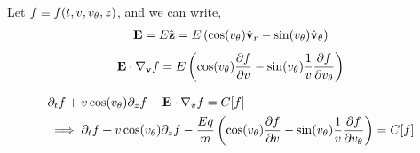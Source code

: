 \documentclass{article}[draft]
\begin{document}
Let $f\equiv f\of{t, v, \vtheta, z}$, and we can write, 
\begin{align*}
	\vect{E} 
	= E \hat{\vect{z}} 
	= E \left( \cos\of{\vtheta} \vrunit - \sin\of{\vtheta} \vthetaunit \right)
\end{align*}
\begin{align*}
	\vect{E}\cdot \nabla_{\vect{v}} f
	= E 
	\left( \cos\of{\vtheta} \frac{\partial f}{\partial \vr} 
	- \sin\of{\vtheta} \frac{1}{\vr} \frac{\partial f}{\partial \vtheta} \right)
\end{align*}

\begin{align*}
&\partial_t f + v\cos\of{\vtheta} \partial_z f -\vect{E}\cdot\nabla_v f = C[f] \\
&\implies \partial_t f + v\cos\of{\vtheta} \partial_z f -\frac{Eq}{m} 
\left( \cos\of{\vtheta} \frac{\partial f}{\partial \vr} 
- \sin\of{\vtheta} \frac{1}{\vr} \frac{\partial f}{\partial \vtheta} \right) = C[f] 
\end{align*}







\clearpage
\end{document}
